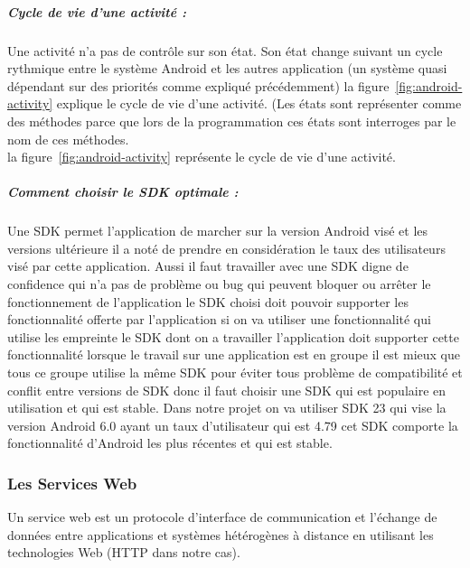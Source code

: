 \subparagraph{Cycle de vie d'une activité :}

Une activité n'a pas de contrôle sur son état. Son état change suivant un
cycle rythmique entre le système Android et les autres application (un système
quasi dépendant sur des priorités comme expliqué précédemment) la
figure~\ref{fig:android-activity} explique le cycle de vie d'une activité. (Les
états sont représenter comme des méthodes parce que lors de la programmation
ces états sont interroges par le nom de ces méthodes.\\ la
figure~\ref{fig:android-activity} représente le cycle de vie d'une activité.


\clearpage

\subparagraph{Comment choisir le SDK optimale :}

Une SDK permet l'application de marcher sur la version Android visé et les
versions ultérieure il a noté de prendre en considération le taux des
utilisateurs visé par cette application. Aussi il faut travailler avec une SDK
digne de confidence qui n'a pas de problème ou bug qui peuvent bloquer ou
arrêter le fonctionnement de l'application le SDK choisi doit pouvoir supporter
les fonctionnalité offerte par l'application si on va utiliser une
fonctionnalité qui utilise les empreinte le SDK dont on a travailler
l'application doit supporter cette fonctionnalité lorsque le travail sur une
application est en groupe il est mieux que tous ce groupe utilise la même SDK
pour éviter tous problème de compatibilité et conflit entre versions de SDK
donc il faut choisir une SDK qui est populaire en utilisation et qui est
stable. Dans notre projet on va utiliser SDK 23 qui vise la version Android 6.0
ayant un taux d'utilisateur qui est 4.79 %
cet SDK comporte la fonctionnalité d'Android les plus récentes et qui est
stable.

\subsubsection{Les Services Web}

Un service web est un protocole d'interface de communication et l'échange de
données entre applications et systèmes hétérogènes à distance en utilisant les
technologies Web (HTTP dans notre cas).

